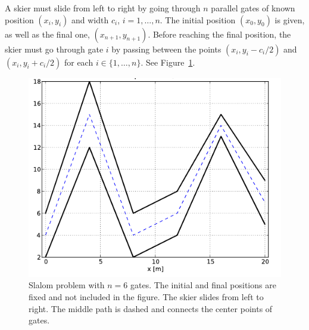 
A skier must slide from left to right by going through $n$ parallel gates of known position $(x_i,y_i)$ and width $c_i$, $i=1,\dots,n$. The initial position $(x_0,y_0)$ is given, as well as the final one, $(x_{n+1},y_{n+1})$.
Before reaching the final position, the skier must go through gate $i$ by passing between the points $(x_i, y_i - c_i/2)$ and $(x_i, y_i + c_i/2)$ for each $i \in \{1, \dots, n\}$. See Figure~\ref{fig:slalom_pic.pdf}. 


\begin{figure}[h]
\begin{center}
\includegraphics{figures/slalom_pic.pdf} 
\end{center}
\caption{\label{fig:slalom_pic.pdf}  Slalom problem with $n=6$ gates. The initial and final positions are fixed and not included in the figure. The skier slides from left to right. The middle path is dashed and connects the center points of gates.}
\end{figure}

